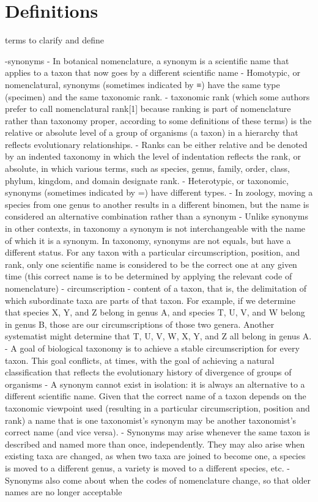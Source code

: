 \section{Definitions}

terms to clarify and define

-synonyms
    - In botanical nomenclature, a synonym is a scientific name that applies to a taxon that now goes by a different scientific name
        - Homotypic, or nomenclatural, synonyms (sometimes indicated by ≡) have the same type (specimen) and the same taxonomic rank.
            - taxonomic rank (which some authors prefer to call nomenclatural rank[1] because ranking is part of nomenclature rather than taxonomy proper, according to some definitions of these terms) is the relative or absolute level of a group of organisms (a taxon) in a hierarchy that reflects evolutionary relationships.
                - Ranks can be either relative and be denoted by an indented taxonomy in which the level of indentation reflects the rank, or absolute, in which various terms, such as species, genus, family, order, class, phylum, kingdom, and domain designate rank.
        - Heterotypic, or taxonomic, synonyms (sometimes indicated by =) have different types.
    - In zoology, moving a species from one genus to another results in a different binomen, but the name is considered an alternative combination rather than a synonym
    - Unlike synonyms in other contexts, in taxonomy a synonym is not interchangeable with the name of which it is a synonym. 
      In taxonomy, synonyms are not equals, but have a different status. For any taxon with a particular circumscription, position, and rank, only one scientific name is considered to be the correct one at any given time (this correct name is to be determined by applying the relevant code of nomenclature)
      - circumscription
        - content of a taxon, that is, the delimitation of which subordinate taxa are parts of that taxon. For example, if we determine that species X, Y, and Z belong in genus A, and species T, U, V, and W belong in genus B, those are our circumscriptions of those two genera. Another systematist might determine that T, U, V, W, X, Y, and Z all belong in genus A.
        - A goal of biological taxonomy is to achieve a stable circumscription for every taxon. This goal conflicts, at times, with the goal of achieving a natural classification that reflects the evolutionary history of divergence of groups of organisms
    - A synonym cannot exist in isolation: it is always an alternative to a different scientific name. Given that the correct name of a taxon depends on the taxonomic viewpoint used (resulting in a particular circumscription, position and rank) a name that is one taxonomist's synonym may be another taxonomist's correct name (and vice versa).
    - Synonyms may arise whenever the same taxon is described and named more than once, independently. They may also arise when existing taxa are changed, as when two taxa are joined to become one, a species is moved to a different genus, a variety is moved to a different species, etc. 
    - Synonyms also come about when the codes of nomenclature change, so that older names are no longer acceptable


